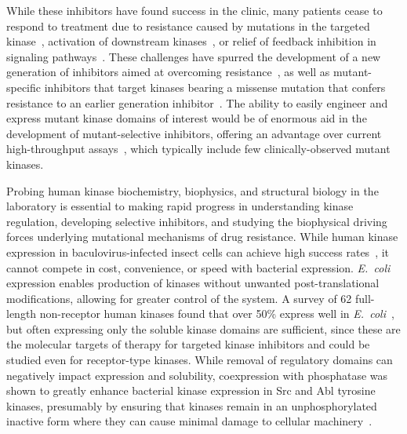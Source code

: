 \documentclass[phd,tocprelim]{cornell}
\begin{document}
While these inhibitors have found success in the clinic, many patients cease to respond to treatment due to resistance caused by mutations in the targeted kinase~\citep{Pao:2005dp}, activation of downstream kinases~\citep{knight_targeting_2010}, or relief of feedback inhibition in signaling pathways~\citep{chandarlapaty_akt_2011}. 
These challenges have spurred the development of a new generation of inhibitors aimed at overcoming resistance~\citep{Jia:2016di,Politi:2015fg}, as well as mutant-specific inhibitors that target kinases bearing a missense mutation that confers resistance to an earlier generation inhibitor~\citep{Song:2015gu}. 
The ability to easily engineer and express mutant kinase domains of interest would be of enormous aid in the development of mutant-selective inhibitors, offering an advantage over current high-throughput assays~\citep{karaman:nature-biotech:2008:kinase-selectivity-map,Davis:2011fz,Medard:2015hv}, which typically include few clinically-observed mutant kinases. 

Probing human kinase biochemistry, biophysics, and structural biology in the laboratory is essential to making rapid progress in understanding kinase regulation, developing selective inhibitors, and studying the biophysical driving forces underlying mutational mechanisms of drug resistance.
While human kinase expression in baculovirus-infected insect cells can achieve high success rates~\citep{vertex:2004:kinase-expression,wang:protein-express-pur:2008:high-yield-kinase-insect-cells}, it cannot compete in cost, convenience, or speed with bacterial expression. \emph{E.~coli} expression enables production of kinases without unwanted post-translational modifications, allowing for greater control of the system.  
A survey of 62 full-length non-receptor human kinases found that over 50\% express well in \emph{E.~coli}~\citep{vertex:2004:kinase-expression}, but often expressing only the soluble kinase domains are sufficient, since these are the molecular targets of therapy for targeted kinase inhibitors and could be studied even for receptor-type kinases. While removal of regulatory domains can negatively impact expression and solubility, coexpression with phosphatase was shown to greatly enhance bacterial kinase expression in Src and Abl tyrosine kinases, presumably by ensuring that kinases remain in an unphosphorylated inactive form where they can cause minimal damage to cellular machinery~\citep{seeliger:2005:protein-sci:kinase-expression}. 
\end{document}
